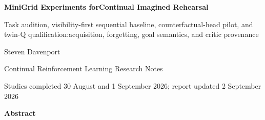 \documentclass[10pt,a4paper]{article}
\begin{document}
\thispagestyle{plain}
\begin{center}
\vspace*{13mm}
{\LARGE\bfseries MiniGrid Experiments for\newline{}Continual Imagined Rehearsal\par}
\vspace{5mm}
{\large\color{brandblue} Task audition, visibility-first sequential baseline, counterfactual-head pilot, and twin-Q qualification:\newline{}acquisition, forgetting, goal semantics, and critic provenance\par}
\vspace{16mm}
{\normalsize Steven Davenport\par}
{\small Continual Reinforcement Learning Research Notes\par}
\vspace{7mm}
{\small Studies completed 30 August and 1 September 2026; report updated 2 September 2026\par}
\end{center}
\vspace{7mm}
\begin{center}\textbf{Abstract}\end{center}
\begingroup\small
\end{document}
